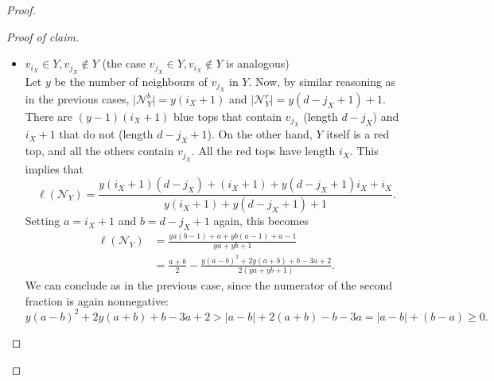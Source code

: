 \documentclass[11pt]{article}
\theoremstyle{definition}
\newcommand{\ny}{\mathcal N_{Y}}
\newcommand*{\abs}[1]{\lvert #1\rvert}
\newenvironment{poc}{\begin{proof}[Proof of claim]\renewcommand*{\qedsymbol}{$\blacksquare$}}{\end{proof}}
\begin{document}
\begin{proof}
\begin{poc}
\begin{itemize}



If $Y\neq X,$ both $(Y,\text{blue})$ and $(Y,\text{red})$ are tops as well.
But these two tops have length $(i_X+1)$ resp. $(d-j_X+1)$ with an average of $\frac{d-j_X + i_X + 2}{2} \leq \frac{d+1}{2}$, so the same upper bound is still valid.


            \item $v_{i_X} \in Y, v_{j_X} \not\in Y$ (the case $v_{j_X} \in Y, v_{i_X} \not \in Y$ is analogous)\\
            Let $y$ be the number of neighbours of $v_{j_X}$ in $Y$.
            Now, by similar reasoning as in the previous cases, $\abs{\ny^b}=y(i_X+1)$ and $\abs{\ny^r}=y(d-j_X+1)+1$.
            There are $(y-1)(i_X+1)$ blue tops that contain $v_{j_X}$ (length $d-j_X$) and $i_X+1$ that do not (length $d-j_X+1$).
            On the other hand, $Y$ itself is a red top, and all the others contain $v_{j_X}$. All the red tops have length $i_X$. 
            This implies that %
   $$\ell(\ny)=\frac{y(i_X+1)(d-j_X)+(i_X+1)+y(d-j_X+1)i_X+i_X }{y(i_X+1)+y(d-j_X+1)+1}.$$
   Setting $a = i_X+1$ and $b = d-j_X+1$ again, this becomes
   \begin{align*}
        \ell(\ny) &= \frac{y a (b - 1) + a + y b (a - 1) + a-1}{ya+yb+1} \\
        &= \frac{a+b}{2} - \frac{y(a-b)^2 + 2y(a+b) + b - 3a+2}{2(ya+yb+1)}.   
   \end{align*}
   We can conclude as in the previous case, since the numerator of the second fraction is again nonnegative:
$$y(a-b)^2 + 2y(a+b) + b - 3a + 2 > |a-b| + 2(a+b) - b - 3a = |a-b| + (b-a) \geq 0.$$
   

\end{itemize}
\end{poc}
\end{proof}
\end{document}
